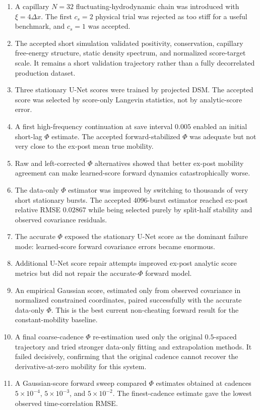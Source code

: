\documentclass[11pt]{article}
\begin{document}
\begin{enumerate}
    \item A capillary \(N=32\) fluctuating-hydrodynamic chain was introduced with \(\xi=4\Delta x\).  The first \(c_s=2\) physical trial was rejected as too stiff for a useful benchmark, and \(c_s=1\) was accepted.
    \item The accepted short simulation validated positivity, conservation, capillary free-energy structure, static density spectrum, and normalized score-target scale.  It remains a short validation trajectory rather than a fully decorrelated production dataset.
    \item Three stationary U-Net scores were trained by projected DSM.  The accepted score was selected by score-only Langevin statistics, not by analytic-score error.
    \item A first high-frequency continuation at save interval \(0.005\) enabled an initial short-lag \(\Phi\) estimate.  The accepted forward-stabilized \(\Phi\) was adequate but not very close to the ex-post mean true mobility.
    \item Raw and left-corrected \(\Phi\) alternatives showed that better ex-post mobility agreement can make learned-score forward dynamics catastrophically worse.
    \item The data-only \(\Phi\) estimator was improved by switching to thousands of very short stationary bursts.  The accepted 4096-burst estimator reached ex-post relative RMSE \(0.02867\) while being selected purely by split-half stability and observed covariance residuals.
    \item The accurate \(\Phi\) exposed the stationary U-Net score as the dominant failure mode: learned-score forward covariance errors became enormous.
    \item Additional U-Net score repair attempts improved ex-post analytic score metrics but did not repair the accurate-\(\Phi\) forward model.
    \item An empirical Gaussian score, estimated only from observed covariance in normalized constrained coordinates, paired successfully with the accurate data-only \(\Phi\).  This is the best current non-cheating forward result for the constant-mobility baseline.
    \item A final coarse-cadence \(\Phi\) re-estimation used only the original \(0.5\)-spaced trajectory and tried stronger data-only fitting and extrapolation methods.  It failed decisively, confirming that the original cadence cannot recover the derivative-at-zero mobility for this system.
    \item A Gaussian-score forward sweep compared \(\Phi\) estimates obtained at cadences \(5\times10^{-4}\), \(5\times10^{-3}\), and \(5\times10^{-2}\).  The finest-cadence estimate gave the lowest observed time-correlation RMSE.
\end{enumerate}
\end{document}

